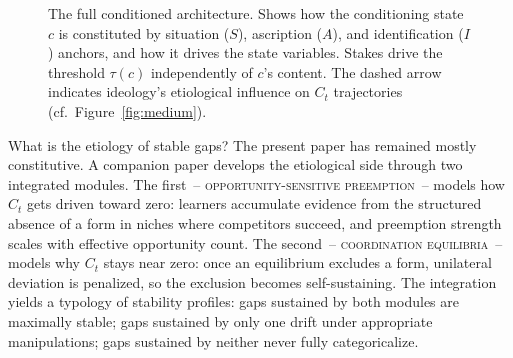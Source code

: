 \documentclass[12pt,letterpaper]{article}
\newcommand{\term}[1]{\textsc{#1}}
\begin{document}
\begin{figure}[t]
\caption{The full conditioned architecture. Shows how the conditioning state $c$ is constituted by situation ($S$), ascription ($A$), and identification ($I$) anchors, and how it drives the state variables. Stakes drive the threshold $\tau(c)$ independently of $c$'s content. The dashed arrow indicates ideology's etiological influence on $C_t$ trajectories (cf.\ Figure~\ref{fig:medium}).}
\label{fig:full}
\end{figure}

What is the etiology of stable gaps? The present paper has remained mostly constitutive. A companion paper develops the etiological side through two integrated modules. The first~-- \term{opportunity-sensitive preemption}~-- models how $C_t$ gets driven toward zero: learners accumulate evidence from the structured absence of a form in niches where competitors succeed, and preemption strength scales with effective opportunity count. The second~-- \term{coordination equilibria}~-- models why $C_t$ stays near zero: once an equilibrium excludes a form, unilateral deviation is penalized, so the exclusion becomes self-sustaining. The integration yields a typology of stability profiles: gaps sustained by both modules are maximally stable; gaps sustained by only one drift under appropriate manipulations; gaps sustained by neither never fully categoricalize.
\end{document}
